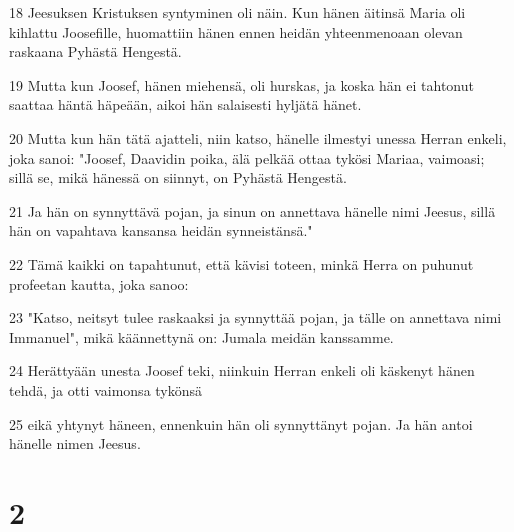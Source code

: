 \par 18 Jeesuksen Kristuksen syntyminen oli näin. Kun hänen äitinsä Maria oli kihlattu Joosefille, huomattiin hänen ennen heidän yhteenmenoaan olevan raskaana Pyhästä Hengestä.
\par 19 Mutta kun Joosef, hänen miehensä, oli hurskas, ja koska hän ei tahtonut saattaa häntä häpeään, aikoi hän salaisesti hyljätä hänet.
\par 20 Mutta kun hän tätä ajatteli, niin katso, hänelle ilmestyi unessa Herran enkeli, joka sanoi: "Joosef, Daavidin poika, älä pelkää ottaa tykösi Mariaa, vaimoasi; sillä se, mikä hänessä on siinnyt, on Pyhästä Hengestä.
\par 21 Ja hän on synnyttävä pojan, ja sinun on annettava hänelle nimi Jeesus, sillä hän on vapahtava kansansa heidän synneistänsä."
\par 22 Tämä kaikki on tapahtunut, että kävisi toteen, minkä Herra on puhunut profeetan kautta, joka sanoo:
\par 23 "Katso, neitsyt tulee raskaaksi ja synnyttää pojan, ja tälle on annettava nimi Immanuel", mikä käännettynä on: Jumala meidän kanssamme.
\par 24 Herättyään unesta Joosef teki, niinkuin Herran enkeli oli käskenyt hänen tehdä, ja otti vaimonsa tykönsä
\par 25 eikä yhtynyt häneen, ennenkuin hän oli synnyttänyt pojan. Ja hän antoi hänelle nimen Jeesus.

\chapter{2}

